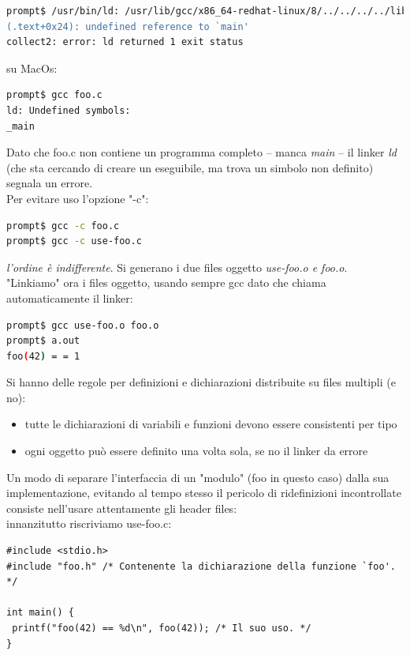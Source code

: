 \documentclass[a4paper,12pt, oneside]{book}
\begin{document}
\begin{shaded}
\begin{lstlisting}[language=bash]
prompt$ /usr/bin/ld: /usr/lib/gcc/x86_64-redhat-linux/8/../../../../lib64/crt1.o: in function `_start':
(.text+0x24): undefined reference to `main'
collect2: error: ld returned 1 exit status
\end{lstlisting}
\end{shaded}
su MacOs:
\begin{shaded}
\begin{lstlisting}[language=bash]
prompt$ gcc foo.c
ld: Undefined symbols:
_main
\end{lstlisting}
\end{shaded}
Dato che foo.c non contiene un programma completo – manca \textit{main} – il linker \textit{ld} (che sta cercando di creare un eseguibile, ma trova un simbolo non definito) segnala un errore.\\
Per evitare uso l'opzione "-c":
\begin{shaded}
\begin{lstlisting}[language=bash]
prompt$ gcc -c foo.c
prompt$ gcc -c use-foo.c
\end{lstlisting}
\end{shaded}
\textit{l'ordine è indifferente}. Si generano i due files oggetto \textit{use-foo.o e foo.o}. "Linkiamo" ora i files oggetto, usando sempre gcc dato che chiama automaticamente il linker:
\begin{shaded}
\begin{lstlisting}[language=bash]
prompt$ gcc use-foo.o foo.o
prompt$ a.out
foo(42) = = 1
\end{lstlisting}
\end{shaded}
Si hanno delle regole per definizioni e dichiarazioni distribuite su files multipli (e no):
\begin{itemize}
\item tutte le dichiarazioni di variabili e funzioni devono essere consistenti per tipo
\item ogni oggetto può essere definito una volta sola, se no il linker da errore
\end{itemize}
Un modo di separare l'interfaccia di un "modulo" (foo in questo caso) dalla sua implementazione, evitando al tempo stesso il pericolo di ridefinizioni incontrollate consiste nell'usare attentamente gli header files:\\
innanzitutto riscriviamo use-foo.c:
\begin{verbatim}
#include <stdio.h>
#include "foo.h" /* Contenente la dichiarazione della funzione `foo'. */

int main() {
 printf("foo(42) == %d\n", foo(42)); /* Il suo uso. */
}
\end{verbatim}
\end{document}
